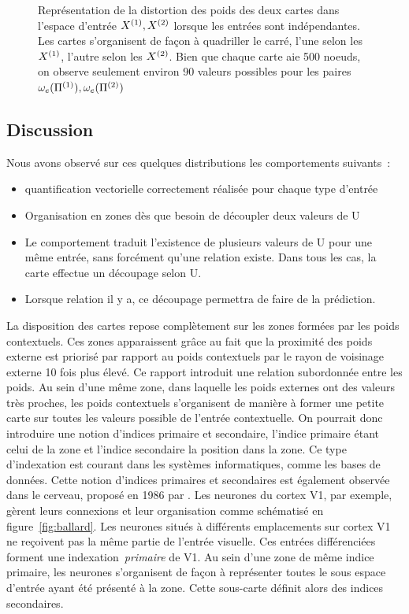 \documentclass[../main]{subfiles}
\begin{document}
\begin{figure}
\begin{minipage}{0.48\textwidth}
	\end{minipage}
	\caption{Représentation de la distortion des poids des deux cartes dans l'espace d'entrée $X^{({1})}, X^{({2})}$ lorsque les entrées sont indépendantes. Les cartes s'organisent de façon à quadriller le carré, l'une selon les $X^{({1})}$, l'autre selon les $X^{({2})}$. Bien que chaque carte aie 500 noeuds, on observe seulement environ 90 valeurs possibles pour les paires $\omega_e(\Pi^{({1})}),\omega_e(\Pi^{({2})})$}
\end{figure}

\subsection{Discussion}

Nous avons observé sur ces quelques distributions les comportements suivants~:
\begin{itemize}
	\item quantification vectorielle correctement réalisée pour chaque type d'entrée
	\item Organisation en zones dès que besoin de découpler deux valeurs de U
	\item Le comportement traduit l'existence de plusieurs valeurs de U pour une même entrée, sans forcément qu'une relation existe. Dans tous les cas, la carte effectue un découpage selon U.
	\item Lorsque relation il y a, ce découpage permettra de faire de la prédiction.
\end{itemize}

La disposition des cartes repose complètement sur les zones formées par les poids contextuels. Ces zones apparaissent grâce au fait que la proximité des poids externe est priorisé par rapport au poids contextuels par le rayon de voisinage externe 10 fois plus élevé. Ce rapport introduit une relation subordonnée entre les poids. 
Au sein d'une même zone, dans laquelle les poids externes ont des valeurs très proches, les poids contextuels s'organisent de manière à former une petite carte sur toutes les valeurs possible de l'entrée contextuelle.
On pourrait donc introduire une notion d'indices primaire et secondaire, l'indice primaire étant celui de la zone et l'indice secondaire la position dans la zone.
Ce type d'indexation est courant dans les systèmes informatiques, comme les bases de données.
Cette notion d'indices primaires et secondaires est également observée dans le cerveau, proposé en 1986 par \cite{ballard_cortical_1986}. Les neurones du cortex V1, par exemple, gèrent leurs connexions et leur organisation comme schématisé en figure~\ref{fig:ballard}.
Les neurones situés à différents emplacements sur cortex V1 ne reçoivent pas la même partie de l'entrée visuelle. Ces entrées différenciées forment une indexation~\emph{primaire} de V1. Au sein d'une zone de même indice primaire, les neurones s'organisent de façon à représenter toutes le sous espace d'entrée ayant été présenté à la zone. Cette sous-carte définit alors des indices secondaires.
\end{document}
